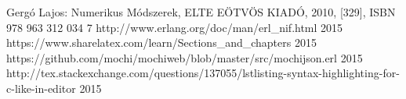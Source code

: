 \documentclass{elteikthesis}
\begin{document}
\begin{thebibliography}{9}
Gergó Lajos: Numerikus Módszerek, ELTE EÖTVÖS KIADÓ, 2010, [329], ISBN 978 963 312 034 7
\bibitem{} {http://www.erlang.org/doc/man/erl\_nif.html} 2015
\bibitem{} {https://www.sharelatex.com/learn/Sections\_and\_chapters} 
2015
\bibitem{} {https://github.com/mochi/mochiweb/blob/master/src/mochijson.erl} 2015
\bibitem{} {http://tex.stackexchange.com/questions/137055/lstlisting-syntax-highlighting-for-c-like-in-editor} 2015
\end{thebibliography}
\end{document}
